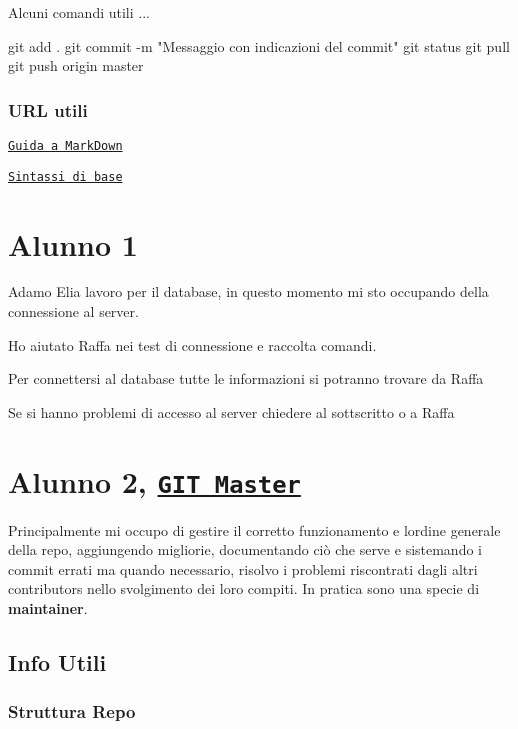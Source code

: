 Alcuni comandi utili ... 
\begin{DoxyCode}
git add .
git commit -m "Messaggio con indicazioni del commit"
git status
git pull
git push origin master
\end{DoxyCode}


\subsubsection*{U\+RL utili}


\begin{DoxyItemize}
\item \href{https://guides.github.com/features/mastering-markdown/}{\tt Guida a Mark\+Down}
\item \href{https://help.github.com/articles/basic-writing-and-formatting-syntax/}{\tt Sintassi di base}
\end{DoxyItemize}

\section*{Alunno 1}

Adamo Elia lavoro per il database, in questo momento mi sto occupando della connessione al server.

Ho aiutato Raffa nei test di connessione e raccolta comandi.

Per connettersi al database tutte le informazioni si potranno trovare da Raffa

Se si hanno problemi di accesso al server chiedere al sottscritto o a Raffa

\section*{Alunno 2, \href{#git-master}{\tt G\+IT Master}}

Principalmente mi occupo di gestire il corretto funzionamento e l\textquotesingle{}ordine generale della repo, aggiungendo migliorie, documentando ciò che serve e sistemando i commit errati ma quando necessario, risolvo i problemi riscontrati dagli altri contributors nello svolgimento dei loro compiti. In pratica sono una specie di {\bfseries maintainer}. \subsection*{Info Utili}

\subsubsection*{Struttura Repo}

